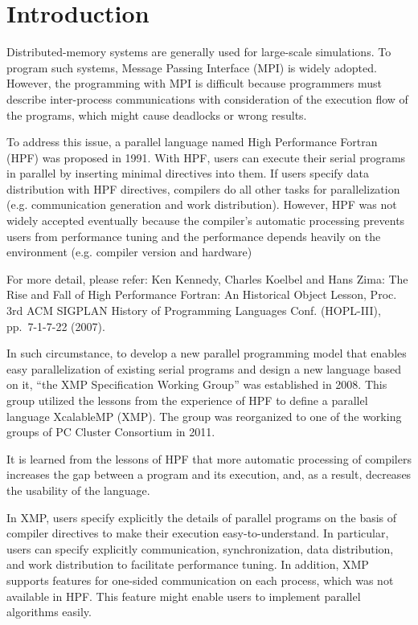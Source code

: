 \section{Introduction}

Distributed-memory systems are generally used for large-scale
simulations. To program such systems, Message Passing Interface (MPI) is
widely adopted. However, the programming with MPI is difficult because
programmers must describe inter-process communications with
consideration of the execution flow of the programs, which might cause
deadlocks or wrong results.

To address this issue, a parallel language named High Performance
Fortran (HPF) was proposed in 1991. With HPF, users can execute their
serial programs in parallel by inserting minimal directives into
them. If users specify data distribution with HPF directives, compilers
do all other tasks for parallelization (e.g. communication generation
and work distribution). However, HPF was not widely accepted eventually
because the compiler’s automatic processing prevents users from
performance tuning and the performance depends heavily on the
environment (e.g. compiler version and hardware)

\begin{mynote}
For more detail, please refer: Ken Kennedy,
Charles Koelbel and Hans Zima: The Rise and Fall of High Performance
Fortran: An Historical Object Lesson, Proc. 3rd ACM SIGPLAN History of
Programming Languages Conf. (HOPL-III), pp.~7-1-7-22 (2007).
\end{mynote}

In such circumstance, to develop a new parallel programming model that
enables easy parallelization of existing serial programs and design a
new language based on it, “the XMP Specification Working Group” was
established in 2008. This group utilized the lessons from the experience
of HPF to define a parallel language XcalableMP (XMP). The group was
reorganized to one of the working groups of PC Cluster Consortium in
2011.

It is learned from the lessons of HPF that more automatic processing of
compilers increases the gap between a program and its execution, and, as
a result, decreases the usability of the language.

In XMP, users specify explicitly the details of parallel programs on the
basis of compiler directives to make their execution
easy-to-understand. In particular, users can specify explicitly
communication, synchronization, data distribution, and work distribution
to facilitate performance tuning. In addition, XMP supports features for
one-sided communication on each process, which was not available in
HPF. This feature might enable users to implement parallel algorithms
easily.


